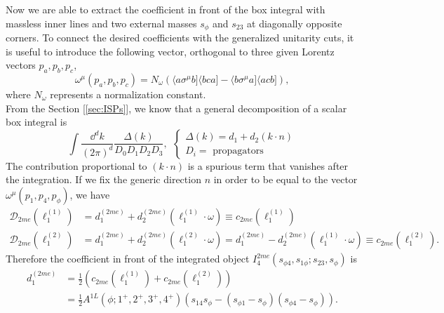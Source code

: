 Now we are able to extract the coefficient in front of the box integral with massless inner lines and two external masses $s_\phi$ and $s_{23}$ at diagonally opposite corners.
To connect the desired coefficients with the generalized unitarity cuts, it is useful to introduce the following vector, orthogonal to three given Lorentz vectors $p_a,p_b,p_c$,
$$
	\omega^\mu(p_a,p_b,p_c)=N_\omega\left(\langle a\sigma^\mu b]\langle b c a]-\langle b \sigma^\mu a]\langle acb]\right),
$$
where $N_\omega$ represents a normalization constant.\\
From the Section [\ref{sec:ISPs}], we know that a general decomposition of a scalar box integral is
$$
	\int \frac{\dd^d k}{(2\pi)^d}\frac{\Delta(k)}{D_0D_1D_2D_3},\ \  \begin{cases}
		\Delta(k)=d_1+d_2 (k\cdot n )\\
		{D_i}=\text{ propagators}
	\end{cases}
$$
The contribution proportional to $(k\cdot n)$ is a spurious term that vanishes after the integration. If we fix the generic direction $n$ in order to be equal to the vector $\omega^\mu(p_1,p_4,p_\phi)$, we have
\begin{align*}
	\mathcal{D}_{2me}(\ell_1^{(1)})&=d_1^{(2me)}+d_2^{(2me)}(\ell_1^{(1)}\cdot \omega)\equiv c_{2me}(\ell_1^{(1)})\\
	\mathcal{D}_{2me}(\ell_1^{(2)})&=d_1^{(2me)}+d_2^{(2me)}(\ell_1^{(2)}\cdot \omega)=d_1^{(2me)}-d_2^{(2me)}(\ell_1^{(1)}\cdot \omega)\equiv c_{2me}(\ell_1^{(2)}).
\end{align*}
Therefore the coefficient in front of the integrated object $I_4^{2me}(s_{\phi4},s_{1\phi};s_{23},s_{\phi})$ is
\begin{align}
	d_1^{(2me)}&=\frac{1}{2}\left(c_{2me}(\ell_1^{(1)})+c_{2me}(\ell_1^{(2)})\right)	\label{eq:coeffquad}\\
	&=\frac{1}{2}A^{1L}(\phi;1^+,2^+,3^+,4^+) \left(s_{14}s_\phi-(s_{\phi 1}-s_\phi)(s_{\phi 4}-s_\phi)\right).	\label{eq:2meboxcoef}
\end{align}
